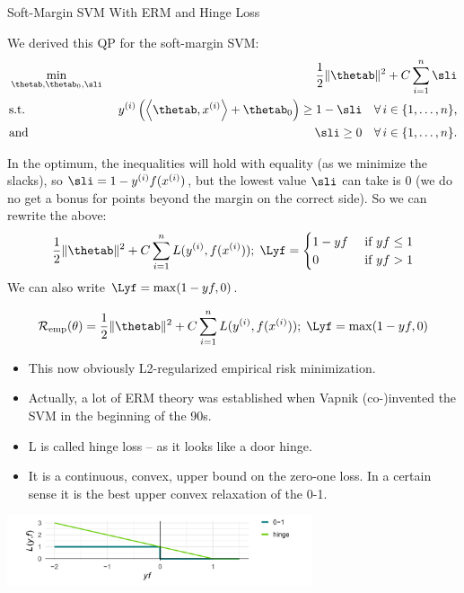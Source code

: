 \begin{vbframe}{Soft-Margin SVM With ERM and Hinge Loss}

We derived this QP for the soft-margin SVM: 
  \begin{eqnarray*}
    & \min\limits_{\thetab, \thetab_0,\sli} & \frac{1}{2} \|\thetab\|^2 + C   \sum_{i=1}^n \sli \\
    & \text{s.t.} & \,\, \yi  \left( \scp{\thetab}{\xi} + \thetab_0 \right) \geq 1 - \sli \quad \forall\, i \in \nset,\\
    & \text{and} & \,\, \sli \geq 0 \quad \forall\, i \in \nset.
  \end{eqnarray*}

  In the optimum, the inequalities will hold with equality (as we minimize the slacks), so $\sli = 1 - \yi \fxi$, but the lowest value $\sli$ can take is 0 (we do no get a bonus for points beyond the margin on the correct side).
  So we can rewrite the above: 
\begin{align*} 
    \frac{1}{2} \|\thetab\|^2 + C \sumin \Lxyi ;\; \Lyf = 
    \begin{cases} 
      1 - y f & \text{ if } y f \leq 1 \\ 
      0       & \text{ if } y f > 1 
    \end{cases}
\end{align*} 
We can also write $\Lyf = \max(1-yf, 0)$.

\framebreak
  $$ \risket = \frac{1}{2} \|\thetab\|^2 + C \sumin \Lxyi ;\; \Lyf = \max(1-yf, 0)$$
  \begin{itemize}
    \item This now obviously L2-regularized empirical risk minimization.
    \item Actually, a lot of ERM theory was established when Vapnik (co-)invented the SVM in the beginning of the 90s.
    \item L is called hinge loss -- as it looks like a door hinge.
    \item It is a continuous, convex, upper bound on the zero-one loss.
      In a certain sense it is the best upper convex relaxation of the 0-1.
  \end{itemize}


\begin{center}
\includegraphics[width = 9cm ]{figure_man/soft-margin.png} \\
\end{center}


\end{vbframe}
